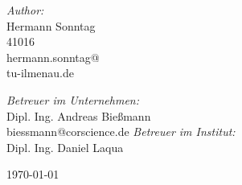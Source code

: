 \begin{titlepage}
\begin{center}
\begin{minipage}{0.4\textwidth}
\begin{flushleft} \large
\emph{Author:}\\
Hermann Sonntag \\
41016\\
hermann.sonntag@\\tu-ilmenau.de
\end{flushleft}
\end{minipage}
\begin{minipage}{0.4\textwidth}
\begin{flushright} \large
\emph{Betreuer im Unternehmen:} \\
Dipl. Ing. Andreas Bießmann \\
biessmann@corscience.de
\emph{Betreuer im Institut:} \\
Dipl. Ing. Daniel Laqua
\end{flushright}
\end{minipage}

\vfill

{\large \today}

\end{center}
\end{titlepage}
